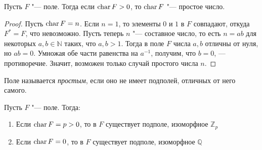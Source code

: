     \begin{proposition}
    	Пусть $F$ "--- поле. Тогда если $\operatorname{char}{F} > 0$, то $\operatorname{char}{F}$ "--- простое число.
    \end{proposition}
    
    \begin{proof}
    	Пусть $\operatorname{char}{F} = n$. Если $n = 1$, то элементы $0$ и $1$ в $F$ совпадают, откуда $F^* = F$, что невозможно. Пусть теперь $n$ "--- составное число, то есть $n = ab$ для некоторых $a, b \in \mathbb{N}$ таких, что $a, b > 1$. Тогда в поле $F$ числа $a, b$ отличны от нуля, но $ab = 0$. Умножая обе части равенства на $a^{-1}$, получим, что $b = 0$, --- противоречие. Значит, возможен только случай простого числа $n$.
    \end{proof}
    
    \begin{definition}
    	Поле называется \textit{простым}, если оно не имеет подполей, отличных от него самого.
    \end{definition}
    
    \begin{theorem}
    	Пусть $F$ "--- поле. Тогда:
    	\begin{enumerate}
    		\item Если $\operatorname{char}{F} = p > 0$, то в $F$ существует подполе, изоморфное $\mathbb{Z}_p$
    		\item Если $\operatorname{char}{F} = 0$, то в $F$ существует подполе, изоморфное $\mathbb{Q}$
    	\end{enumerate}
    \end{theorem}
    
